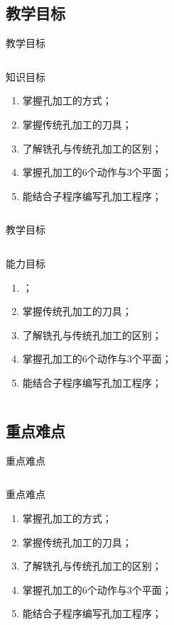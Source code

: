 \documentclass[utf8,zihao=-4]{ctexbeamer}
\begin{document}
\subsection{教学目标}
\begin{frame}{教学目标}
 \begin{columns}[onlytextwidth]
    \begin{block}{知识目标}
        \begin{enumerate}[<+->]
            \item 掌握孔加工的方式；
            \item 掌握传统孔加工的刀具；
            \item 了解铣孔与传统孔加工的区别；
            \item 掌握孔加工的6个动作与3个平面；
            \item 能结合子程序编写孔加工程序；
        \end{enumerate}
    \end{block}
 \end{columns}
\end{frame}

\begin{frame}{教学目标}
	\begin{columns}[onlytextwidth]
		\begin{block}{能力目标}
			\begin{enumerate}[<+->]
				\item ；
				\item 掌握传统孔加工的刀具；
				\item 了解铣孔与传统孔加工的区别；
				\item 掌握孔加工的6个动作与3个平面；
				\item 能结合子程序编写孔加工程序；
			\end{enumerate}
		\end{block}
	\end{columns}
\end{frame}

\subsection{重点难点}
\begin{frame}{重点难点}
 \begin{columns}[onlytextwidth]
	\begin{block}{重点难点}
		\begin{enumerate}[<+->]
			\item 掌握孔加工的方式；
			\item 掌握传统孔加工的刀具；
			\item 了解铣孔与传统孔加工的区别；
			\item 掌握孔加工的6个动作与3个平面；
			\item 能结合子程序编写孔加工程序；
		\end{enumerate}
	\end{block}
\end{columns}
\end{frame}
\end{document}
